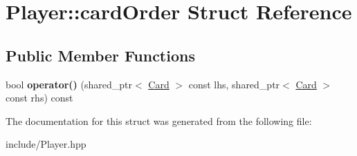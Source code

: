 \hypertarget{structPlayer_1_1cardOrder}{\section{\-Player\-:\-:card\-Order \-Struct \-Reference}
\label{structPlayer_1_1cardOrder}
}
\subsection*{\-Public \-Member \-Functions}
\begin{DoxyCompactItemize}
\item 
\hypertarget{structPlayer_1_1cardOrder_a1992ec2fb8b64e0749dcbbf997a56846}{bool {\bfseries operator()} (shared\-\_\-ptr$<$ \hyperlink{classCard}{\-Card} $>$ const lhs, shared\-\_\-ptr$<$ \hyperlink{classCard}{\-Card} $>$ const rhs) const }\label{structPlayer_1_1cardOrder_a1992ec2fb8b64e0749dcbbf997a56846}

\end{DoxyCompactItemize}


\-The documentation for this struct was generated from the following file\-:\begin{DoxyCompactItemize}
\item 
include/\-Player.\-hpp\end{DoxyCompactItemize}
